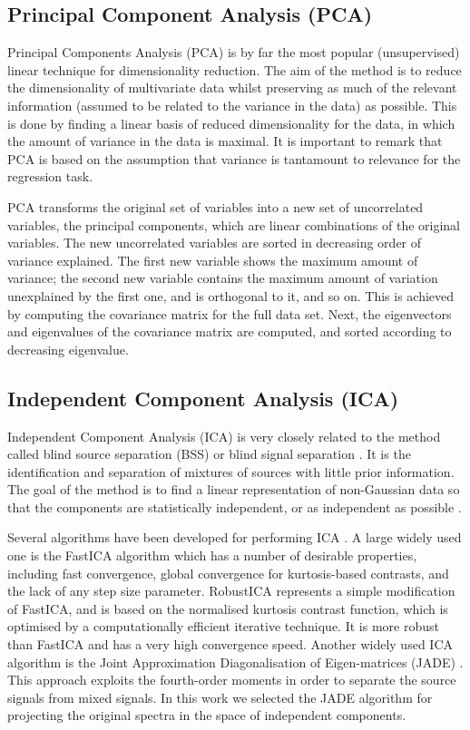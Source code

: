 \documentclass[a4paper,fleqn,usenatbib]{mnras}
\begin{document}
\subsection{Principal Component Analysis (PCA)}

Principal Components Analysis (PCA) \citep{hotelling:33,pearson:01} is
by far the most popular (unsupervised) linear technique for
dimensionality reduction. The aim of the method is to reduce the
dimensionality of multivariate data whilst preserving as much of the
relevant information (assumed to be related to the variance in the
data) as possible. This is done by finding a linear basis of reduced
dimensionality for the data, in which the amount of variance in the
data is maximal. It is important to remark that PCA is based on the
assumption that variance is tantamount to relevance for the regression
task.

PCA transforms the original set of variables into a new set of
uncorrelated variables, the principal components, which are linear
combinations of the original variables. The new uncorrelated variables
are sorted in decreasing order of variance explained. The first
new variable shows the maximum amount of variance; the second
new variable contains the maximum amount of variation unexplained by
the first one, and is orthogonal to it, and so on.  This is
achieved by computing the covariance matrix for the full data
set. Next, the eigenvectors and eigenvalues of the covariance matrix
are computed, and sorted according to decreasing eigenvalue.

\subsection{Independent Component Analysis (ICA)}

Independent Component Analysis (ICA) \citep{comon:94} is very closely
related to the method called blind source separation (BSS) or blind
signal separation \citep{jutten:91}. It is the identification and
separation of mixtures of sources with little prior information. The
goal of the method is to find a linear representation of non-Gaussian
data so that the components are statistically independent, or as
independent as possible \citep{hyvarinen:00}.

Several algorithms have been developed for performing ICA
\citep{bell:95,belouchrani:97,ollila:06,li:08}. A large widely used
one is the FastICA algorithm \citep{hyvarinen:00} which has a number
of desirable properties, including fast convergence, global
convergence for kurtosis-based contrasts, and the lack of any step
size parameter.  RobustICA \citep{zarzoso:10} represents a simple
modification of FastICA, and is based on the normalised kurtosis
contrast function, which is optimised by a computationally efficient
iterative technique. It is more robust than FastICA and has a very
high convergence speed.  Another widely used ICA algorithm is the
Joint Approximation Diagonalisation of Eigen-matrices (JADE)
\citep{cardoso:93}. This approach exploits the fourth-order moments in
order to separate the source signals from mixed signals. In this work
we selected the JADE algorithm for projecting the original spectra in
the space of independent components.
\end{document}
